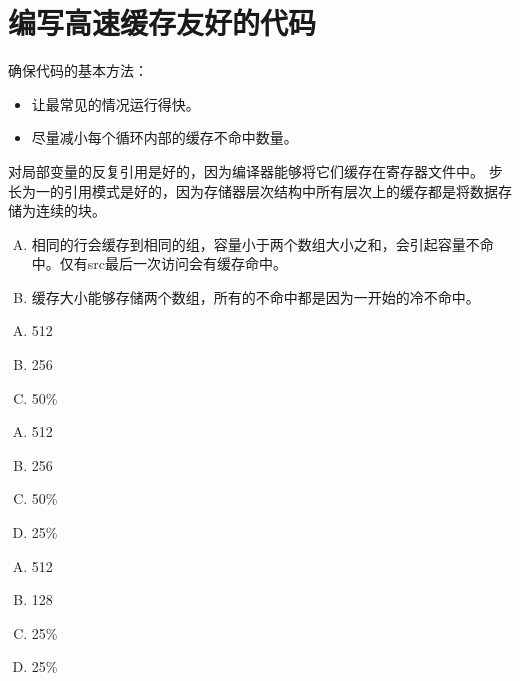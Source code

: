 
\section{编写高速缓存友好的代码}
{
    确保代码的基本方法：

    \begin{itemize}
        \item 让最常见的情况运行得快。
        \item 尽量减小每个循环内部的缓存不命中数量。
    \end{itemize}

    对局部变量的反复引用是好的，因为编译器能够将它们缓存在寄存器文件中。
    步长为一的引用模式是好的，因为存储器层次结构中所有层次上的缓存都是将数据存储为连续的块。

    \begin{practicec}
        \begin{enumerate}[A.]
            \item 相同的行会缓存到相同的组，容量小于两个数组大小之和，会引起容量不命中。仅有src最后一次访问会有缓存命中。
            \item 缓存大小能够存储两个数组，所有的不命中都是因为一开始的冷不命中。
        \end{enumerate}
    \end{practicec}

    \begin{practicec}
        \begin{enumerate}[A.]
            \item 512
            \item 256
            \item 50\%
        \end{enumerate}
    \end{practicec}

    \begin{practicec}
        \begin{enumerate}[A.]
            \item 512
            \item 256
            \item 50\%
            \item 25\%
        \end{enumerate}
    \end{practicec}

    \begin{practicec}
        \begin{enumerate}[A.]
            \item 512
            \item 128
            \item 25\%
            \item 25\%
        \end{enumerate}
    \end{practicec}
}
